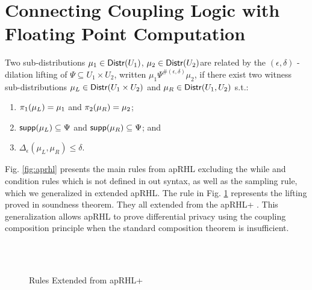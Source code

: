 \documentclass[a4paper,11pt]{article}
\begin{document}
\section{
Connecting Coupling Logic
%
with Floating Point Computation
}
%
\begin{defn}
Two sub-distributions $\mu_1 \in \mathsf{Distr}(U_1)$, $\mu_2 \in \mathsf{Distr}(U_2)$are related by the $(\epsilon, \delta)$ - dilation lifting of $\Psi \subseteq U_1 \times U_2$, written $\mu_1 \Psi^{\#(\epsilon, \delta)} \mu_2$, if there exist two witness sub-distributions $\mu_L \in \mathsf{Distr}(U_1 \times U_2)$ and $\mu_R \in \mathsf{Distr}(U_1, U_2)$ s.t.:
\begin{enumerate}
	\item $\pi_1(\mu_L) = \mu_1$ and $\pi_2(\mu_R) = \mu_2$;
	\item $\mathsf{supp}(\mu_L) \subseteq \Psi$ and $\mathsf{supp}(\mu_R) \subseteq \Psi$; and
	\item $\Delta_{\epsilon}(\mu_L, \mu_R) \leq \delta$.
\end{enumerate}
\end{defn}
%
Fig. \ref{fig:aprhl} presents the main rules from apRHL excluding the while and condition rules which is not defined in out syntax, as well as the sampling rule, which we generalized in extended apRHL.
The rule in Fig. \ref{fig:aprhlplus} represents the lifting proved in soundness theorem. They all extended from the apRHL+ \cite{barthe2016proving}. This generalization allows apRHL to prove differential privacy using the coupling composition principle when the standard composition theorem is insufficient.
%
\begin{figure}[t]
\\
\\
\caption{Rules Extended from apRHL+}
\label{fig:aprhlplus}
\end{figure}
\end{document}
